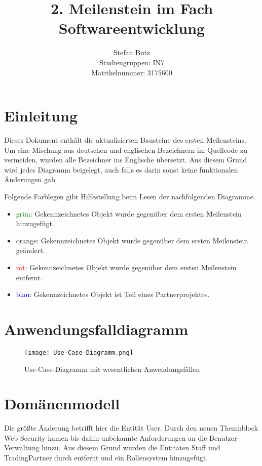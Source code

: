\documentclass[12pt, a4paper, titlepage]{article}
\begin{document}
\title{2. Meilenstein im Fach Softwareentwicklung}
\author{Stefan Butz \\
		Studiengruppen: IN7 \\
		Matrikelnummer: 3175600}

\maketitle

\section{Einleitung}
Dieses Dokument enthält die aktualisierten Bausteine des ersten Meilensteins.
Um eine Mischung aus deutschen und englischen Bezeichnern im Quellcode zu
vermeiden, wurden alle Bezeichner ins Englische übersetzt.
Aus diesem Grund wird jedes Diagramm beigelegt, auch falls es darin sonst
keine funktionalen Änderungen gab.

Folgende Farblegen gibt Hilfestellung beim Lesen der nachfolgenden Diagramme.
\begin{itemize}
	\item \textcolor{green}{grün}:
	Gekennzeichnetes Objekt wurde gegenüber dem ersten Meilenstein hinzugefügt.
	\item \textcolor{YellowOrange}{orange}:
	Gekennzeichnetes Objekt wurde gegenüber dem ersten Meilenstein geändert.
	\item \textcolor{red}{rot}:
	Gekennzeichnetes Objekt wurde gegenüber dem ersten Meilenstein entfernt.
	\item \textcolor{blue}{blau}:
	Gekennzeichnetes Objekt ist Teil eines Partnerprojektes.
\end{itemize}

\clearpage
\section{Anwendungsfalldiagramm}
\begin{figure}[H]
	\centering
    \texttt{[image: Use-Case-Diagramm.png]}
	\caption{Use-Case-Diagramm mit wesentlichen Anwendungsfällen}
	\label{fig:use_case}
\end{figure}

\clearpage
\section{Domänenmodell}
Die größte Änderung betrifft hier die Entität User.
Durch den neuen Themnblock Web Security kamen bis dahin unbekannte
Anforderungen an die Benutzer-Verwaltung hinzu. Aus diesem Grund wurden
die Entitäten Staff und TradingPartner durch entfernt und ein Rollensystem
hinzugefügt.
\end{document}
